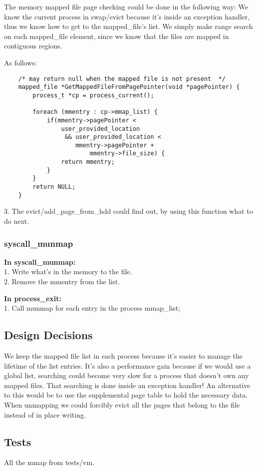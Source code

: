 The memory mapped file page checking could be done in the following way: We know the current process in swap/evict because it's inside an exception handler, thus we know how to get to the mapped\_file's list. We simply make range search on each mapped\_file element, since we know that the files are mapped in contiguous regions.

As follows:
\begin{lstlisting}	
	/* may return null when the mapped file is not present  */
	mapped_file *GetMappedFileFromPagePointer(void *pagePointer) {
		process_t *cp = process_current();
		
		foreach (mmentry : cp->mmap_list) {
			if(mmentry->pagePointer < 
				user_provided_location 
				 && user_provided_location < 
					mmentry->pagePointer + 
						mmentry->file_size) {
				return mmentry;
			}
		}
		return NULL;
	}
\end{lstlisting}
	3. The evict/add\_page\_from\_hdd could find out, by using this function what to do next.

\subsubsection{ syscall\_munmap }
\textbf{In syscall\_munmap:}
	\\1. Write what's in the memory to the file. 
	\\2. Remove the mmentry from the list.

	 \textbf{In process\_exit:}
	\\1. Call munmap for each entry in the process mmap\_list;


\subsection{Design Decisions}
We keep the mapped file list in each process because it's easier to manage the lifetime of the list entries. It's also a performance gain because if we would use a global list, searching could become very slow for a process that doesn't own any mapped files. That searching is done inside an exception handler! An alternative to this would be to use the supplemental page table to hold the necessary data.
\\When unmapping we could forcibly evict all the pages that belong to the file instead of in place writing.
\subsection{Tests}
All the mmap from tests/vm.


